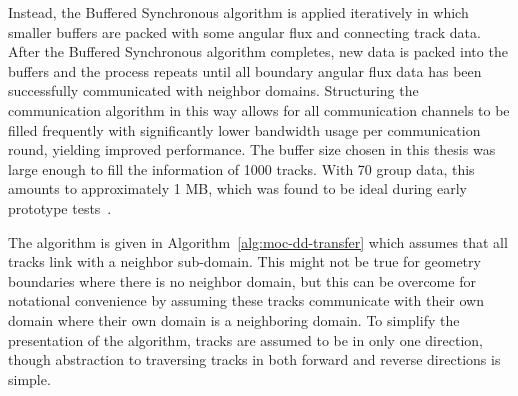 Instead, the Buffered Synchronous algorithm is applied iteratively in which smaller buffers are packed with some angular flux and connecting track data. After the Buffered Synchronous algorithm completes, new data is packed into the buffers and the process repeats until all boundary angular flux data has been successfully communicated with neighbor domains. Structuring the communication algorithm in this way allows for all communication channels to be filled frequently with significantly lower bandwidth usage per communication round, yielding improved performance. The buffer size chosen in this thesis was large enough to fill the information of 1000 tracks. With 70 group data, this amounts to approximately 1 MB, which was found to be ideal during early prototype tests~\cite{simplemoc}.

The algorithm is given in Algorithm~\ref{alg:moc-dd-transfer} which assumes that all tracks link with a neighbor sub-domain. This might not be true for geometry boundaries where there is no neighbor domain, but this can be overcome for notational convenience by assuming these tracks communicate with their own domain where their own domain is a neighboring domain. To simplify the presentation of the algorithm, tracks are assumed to be in only one direction, though abstraction to traversing tracks in both forward and reverse directions is simple.

